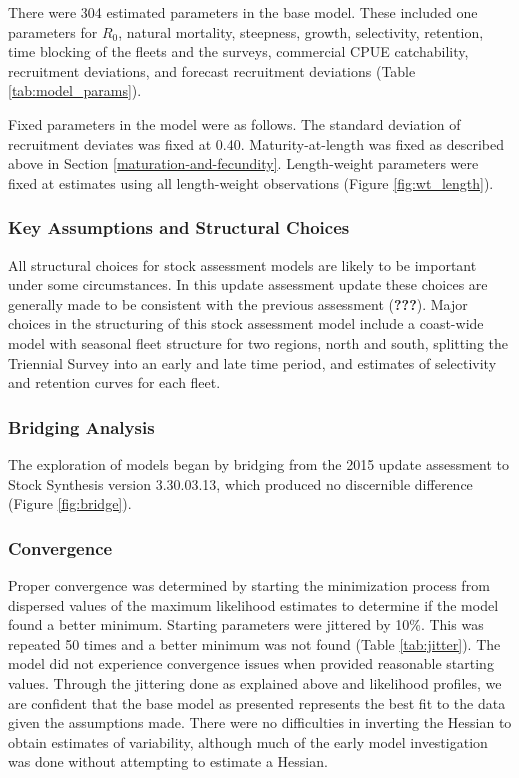 \documentclass[12pt,]{article}
\begin{document}
There were 304 estimated parameters in the base model. These included
one parameters for \(R_0\), natural mortality, steepness, growth,
selectivity, retention, time blocking of the fleets and the surveys,
commercial CPUE catchability, recruitment deviations, and forecast
recruitment deviations (Table \ref{tab:model_params}).

Fixed parameters in the model were as follows. The standard deviation of
recruitment deviates was fixed at 0.40. Maturity-at-length was fixed as
described above in Section \ref{maturation-and-fecundity}. Length-weight
parameters were fixed at estimates using all length-weight observations
(Figure \ref{fig:wt_length}).

\subsubsection{Key Assumptions and Structural
Choices}\label{key-assumptions-and-structural-choices}

All structural choices for stock assessment models are likely to be
important under some circumstances. In this update assessment update
these choices are generally made to be consistent with the previous
assessment ({\textbf{???}}). Major choices in the structuring of this
stock assessment model include a coast-wide model with seasonal fleet
structure for two regions, north and south, splitting the Triennial
Survey into an early and late time period, and estimates of selectivity
and retention curves for each fleet.

\subsubsection{Bridging Analysis}\label{bridging-analysis}

The exploration of models began by bridging from the 2015 update
assessment to Stock Synthesis version 3.30.03.13, which produced no
discernible difference (Figure \ref{fig:bridge}).

\subsubsection{Convergence}\label{convergence}

Proper convergence was determined by starting the minimization process
from dispersed values of the maximum likelihood estimates to determine
if the model found a better minimum. Starting parameters were jittered
by 10\%. This was repeated 50 times and a better minimum was not found
(Table \ref{tab:jitter}). The model did not experience convergence
issues when provided reasonable starting values. Through the jittering
done as explained above and likelihood profiles, we are confident that
the base model as presented represents the best fit to the data given
the assumptions made. There were no difficulties in inverting the
Hessian to obtain estimates of variability, although much of the early
model investigation was done without attempting to estimate a Hessian.
\end{document}
